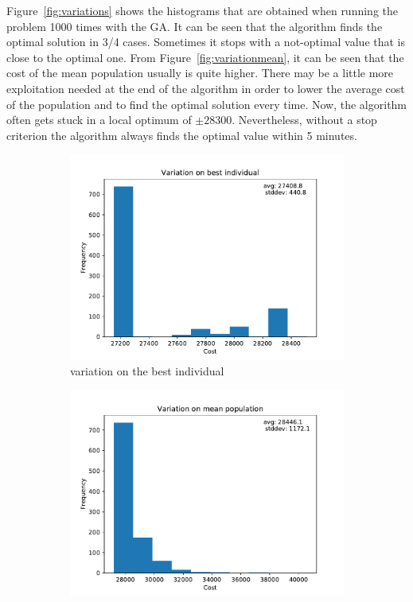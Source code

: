 \documentclass[a4paper,10pt]{article}
\begin{document}
Figure~\ref{fig:variations} shows the histograms that are obtained when running the problem 1000 times with the GA. It can be seen that the algorithm finds the optimal solution in 3/4 cases. Sometimes it stops with a not-optimal value that is close to the optimal one. From Figure~\ref{fig:variationmean}, it can be seen that the cost of the mean population usually is quite higher. There may be a little more exploitation needed at the end of the algorithm in order to lower the average cost of the population and to find the optimal solution every time. Now, the algorithm often gets stuck in a local optimum of $\pm 28300$. Nevertheless, without a stop criterion the algorithm always finds the optimal value within 5 minutes.
\begin{figure}[H]
    \begin{subfigure}{0.55\linewidth}
      \centering
      \includegraphics[width=\linewidth]{img/variationbest.pdf}
      \caption{variation on the best individual}
      \label{fig:variationbest}
    \end{subfigure}
    \begin{subfigure}{0.5\linewidth}
      \centering
      \includegraphics[width=\linewidth]{img/variationmean2.pdf}

\end{subfigure}
\end{figure}
\end{document}
